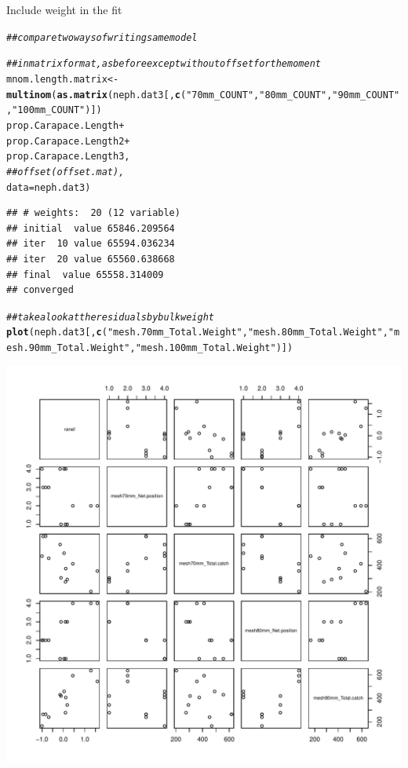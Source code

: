 \documentclass[12pt]{article}\usepackage[]{graphicx}\usepackage[]{color}
\makeatletter
\def\maxwidth{ %
  \ifdim\Gin@nat@width>\linewidth
    \linewidth
  \else
    \Gin@nat@width
  \fi
}
\newcommand{\hlstr}[1]{\textcolor[rgb]{0.192,0.494,0.8}{#1}}%
\newcommand{\hlcom}[1]{\textcolor[rgb]{0.678,0.584,0.686}{\textit{#1}}}%
\newcommand{\hlopt}[1]{\textcolor[rgb]{0,0,0}{#1}}%
\newcommand{\hlstd}[1]{\textcolor[rgb]{0.345,0.345,0.345}{#1}}%
\newcommand{\hlkwb}[1]{\textcolor[rgb]{0.69,0.353,0.396}{#1}}%
\newcommand{\hlkwc}[1]{\textcolor[rgb]{0.333,0.667,0.333}{#1}}%
\newcommand{\hlkwd}[1]{\textcolor[rgb]{0.737,0.353,0.396}{\textbf{#1}}}%
\newenvironment{kframe}{%
 \def\at@end@of@kframe{}%
 \ifinner\ifhmode%
  \def\at@end@of@kframe{\end{minipage}}%
  \begin{minipage}{\columnwidth}%
 \fi\fi%
 \def\FrameCommand##1{\hskip\@totalleftmargin \hskip-\fboxsep
 \colorbox{shadecolor}{##1}\hskip-\fboxsep
     \hskip-\linewidth \hskip-\@totalleftmargin \hskip\columnwidth}%
 \MakeFramed {\advance\hsize-\width
   \@totalleftmargin\z@ \linewidth\hsize
   \@setminipage}}%
 {\par\unskip\endMakeFramed%
 \at@end@of@kframe}
\newenvironment{knitrout}{}{} %
\makeatother
\begin{document}
Include weight in the fit

\begin{knitrout}\footnotesize
{}\color{fgcolor}\begin{kframe}
\begin{alltt}
\hlcom{## compare two ways of writing same model}

\hlcom{## in matrix format, as before except without offset for the moment}
\hlstd{mnom.length.matrix} \hlkwb{<-} \hlkwd{multinom}\hlstd{(}\hlkwd{as.matrix}\hlstd{(neph.dat3[,} \hlkwd{c}\hlstd{(}\hlstr{"70mm_COUNT"}\hlstd{,} \hlstr{"80mm_COUNT"}\hlstd{,} \hlstr{"90mm_COUNT"}\hlstd{,} \hlstr{"100mm_COUNT"}\hlstd{)])} \hlopt{~}
                               \hlstd{prop.Carapace.Length} \hlopt{+}
                               \hlstd{prop.Carapace.Length2} \hlopt{+}
                               \hlstd{prop.Carapace.Length3,}
                               \hlcom{##offset(offset.mat), }
                               \hlkwc{data} \hlstd{= neph.dat3)}
\end{alltt}
\begin{verbatim}
## # weights:  20 (12 variable)
## initial  value 65846.209564 
## iter  10 value 65594.036234
## iter  20 value 65560.638668
## final  value 65558.314009 
## converged
\end{verbatim}
\begin{alltt}
\hlcom{## take a look at the residuals by bulk weight}
\hlkwd{plot}\hlstd{(neph.dat3[,} \hlkwd{c}\hlstd{(}\hlstr{"mesh.70mm_Total.Weight"}\hlstd{,} \hlstr{"mesh.80mm_Total.Weight"}\hlstd{,} \hlstr{"mesh.90mm_Total.Weight"}\hlstd{,} \hlstr{"mesh.100mm_Total.Weight"}\hlstd{)])}
\end{alltt}
\end{kframe}
\includegraphics[width=\maxwidth]{figure/unnamed-chunk-9-1} 

\end{knitrout}
\end{document}
